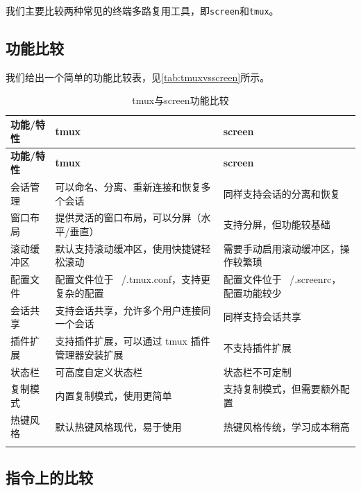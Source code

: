 我们主要比较两种常见的终端多路复用工具，即\texttt{screen}和\texttt{tmux}。

\subsection{功能比较}

我们给出一个简单的功能比较表，见\autoref{tab:tmuxvsscreen}所示。

\begin{longtable}{|p{2cm}|p{6cm}|p{6cm}|}
    \hline
    \textbf{功能/特性} & \textbf{tmux} & \textbf{screen} \\
    \hline
    \endfirsthead

    \hline
    \textbf{功能/特性} & \textbf{tmux} & \textbf{screen} \\
    \hline
    \endhead
    
    \hline
    \endfoot
    
    \hline
    \endlastfoot
    
    会话管理 & 可以命名、分离、重新连接和恢复多个会话 & 同样支持会话的分离和恢复 \\
    \hline
    窗口布局 & 提供灵活的窗口布局，可以分屏（水平/垂直） & 支持分屏，但功能较基础 \\
    \hline
    滚动缓冲区 & 默认支持滚动缓冲区，使用快捷键轻松滚动 & 需要手动启用滚动缓冲区，操作较繁琐 \\
    \hline
    配置文件 & 配置文件位于 ~/.tmux.conf，支持更复杂的配置 & 配置文件位于 ~/.screenrc，配置功能较少 \\
    \hline
    会话共享 & 支持会话共享，允许多个用户连接同一个会话 & 同样支持会话共享 \\
    \hline
    插件扩展 & 支持插件扩展，可以通过 tmux 插件管理器安装扩展 & 不支持插件扩展 \\
    \hline
    状态栏 & 可高度自定义状态栏 & 状态栏不可定制 \\
    \hline
    复制模式 & 内置复制模式，使用更简单 & 支持复制模式，但需要额外配置 \\
    \hline
    热键风格 & 默认热键风格现代，易于使用 & 热键风格传统，学习成本稍高 \\
    \hline

    \caption{tmux与screen功能比较}
    \label{tab:tmuxvsscreen}
    
\end{longtable}

\subsection{指令上的比较}


